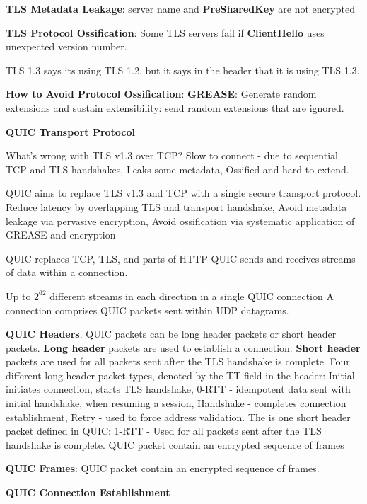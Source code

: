\documentclass{article}
\begin{document}
\textbf{TLS Metadata Leakage}: server name and \textbf{PreSharedKey} are not encrypted

\textbf{TLS Protocol Ossification}: Some TLS servers fail if \textbf{ClientHello} uses unexpected version number.

TLS 1.3 says its using TLS 1.2, but it says in the header that it is using TLS 1.3.

\textbf{How to Avoid Protocol Ossification}:
\textbf{GREASE}: Generate random extensions and sustain extensibility: send random extensions that are ignored.

\vspace{\baselineskip}
\textbf{QUIC Transport Protocol}

What's wrong with TLS v1.3 over TCP\@?
Slow to connect {-} due to sequential TCP and TLS handshakes,
Leaks some metadata,
Ossified and hard to extend.

QUIC aims to replace TLS v1.3 and TCP with a single secure transport protocol.
Reduce latency by overlapping TLS and transport handshake,
Avoid metadata leakage via pervasive encryption,
Avoid ossification via systematic application of GREASE and encryption

QUIC replaces TCP, TLS, and parts of HTTP
QUIC sends and receives streams of data within a connection.

Up to $2^{62}$ different streams in each direction in a single QUIC connection
A connection comprises QUIC packets sent within UDP datagrams.

\textbf{QUIC Headers}. QUIC packets can be long header packets or short header packets.
\textbf{Long header} packets are used to establish a connection.
\textbf{Short header} packets are used for all packets sent after the TLS handshake is complete.
Four different long-header packet types, denoted by the TT field in the header:
Initial {-} initiates connection, starts TLS handshake,
0-RTT {-} idempotent data sent with initial handshake, when resuming a session,
Handshake {-} completes connection establishment,
Retry {-} used to force address validation.
The is one short header packet defined in QUIC\@:
1-RTT {-} Used for all packets sent after the TLS handshake is complete. QUIC packet contain an encrypted sequence of frames

\textbf{QUIC Frames}: QUIC packet contain an encrypted sequence of frames.


\vspace{\baselineskip}
\textbf{QUIC Connection Establishment}
\end{document}
